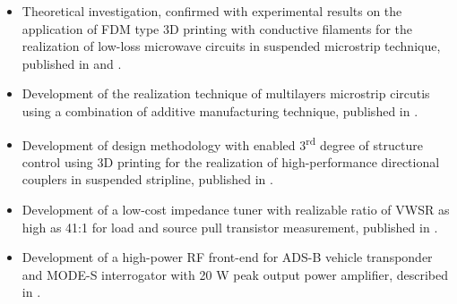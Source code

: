 \begin{itemize}[nosep]
\item Theoretical investigation, confirmed with experimental results on the application of FDM type 3D printing with conductive filaments for the realization of low-loss microwave circuits in suspended microstrip technique, published in \cite{iceese_3D_graphene} and \cite{ectc_electrify}.
\item Development of the realization technique of multilayers microstrip circutis using a combination of additive manufacturing technique, published in \cite{ectc_df}.
\item Development of design methodology with enabled 3\textsuperscript{rd} degree of structure control using 3D printing for the realization of high-performance directional couplers in suspended stripline, published in \cite{polyjet_susp_coupler}.
\item Development of a low-cost impedance tuner with realizable ratio of VWSR as high as 41:1 for load and source pull transistor measurement, published in \cite{rws_imp_tuner}.
\item Development of a high-power RF front-end for ADS-B vehicle transponder and MODE-S interrogator with 20 W peak output power amplifier, described in \cite{avionix_report}.
\end{itemize}

